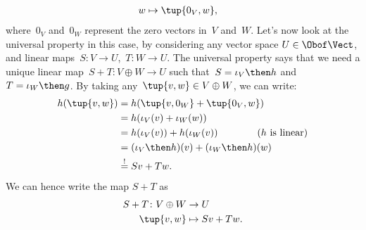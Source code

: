 {\begin{example}
\begin{equation*}
\begin{aligned}
                w                & \mapsto \tup{0_V,w},
            \end{aligned}
        \end{equation*}
        where~$0_V$ and~$0_W$ represent the zero vectors in~$V$ and~$W$.
        Let's now look at the universal property in this case, by considering any vector space $U\in \Obof\Vect$, and linear maps~$S\colon V\to U$,~$T\colon W\to U$.
        The universal property says that we need a unique linear map~$S+T\colon V\oplus W \to U$ such that~$S=\iota_V\then h$ and~$T=\iota_W\then g$.
        By taking any~$\tup{v,w}\in V\oplus W$, we can write:
        \begin{equation*}
            \begin{aligned}
                h(\tup{v,w}) & =h(\tup{v,0_W}+\tup{0_V,w})                                      \\
                             & =h(\iota_V(v)+\iota_W(w))                                        \\
                             & =h(\iota_V(v))+h(\iota_W(v)) \qquad \qquad (h \text{ is linear}) \\
                             & =(\iota_V\then h)(v)+(\iota_W\then h)(w)                         \\
                             & \overset{!}{=}Sv+Tw.
            \end{aligned}
        \end{equation*}
        We can hence write the map $S+T$ as
        \begin{equation*}
            \begin{aligned}
                S+T\colon V\oplus W & \to U          \\
                \tup{v,w}           & \mapsto Sv+Tw.
            \end{aligned}
        \end{equation*}
    \end{example}
}
